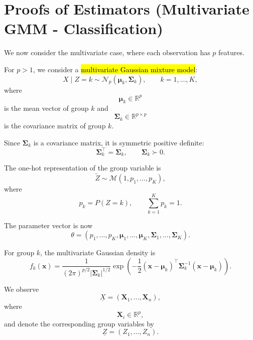 \section{Proofs of Estimators (Multivariate GMM - Classification)}

We now consider the multivariate case, where each observation has
$p$ features.

For $p>1$, we consider a \hl{multivariate Gaussian mixture model}:
\begin{equation*}
X\mid Z=k
\sim
\mathcal{N}_p(\boldsymbol{\mu}_k,\boldsymbol{\Sigma}_k),
\qquad
k=1,\ldots,K,
\end{equation*}
where
\begin{equation*}
\boldsymbol{\mu}_k\in\mathbb{R}^p
\end{equation*}
is the mean vector of group $k$ and
\begin{equation*}
\boldsymbol{\Sigma}_k\in\mathbb{R}^{p\times p}
\end{equation*}
is the covariance matrix of group $k$.

Since $\boldsymbol{\Sigma}_k$ is a covariance matrix, it is symmetric
positive definite:
\begin{equation*}
\boldsymbol{\Sigma}_k^\top
=
\boldsymbol{\Sigma}_k,
\qquad
\boldsymbol{\Sigma}_k\succ0.
\end{equation*}

The one-hot representation of the group variable is
\begin{equation*}
\tilde{Z}\sim\mathcal{M}(1,p_1,\ldots,p_K),
\end{equation*}
where
\begin{equation*}
p_k=P(Z=k),
\qquad
\sum_{k=1}^Kp_k=1.
\end{equation*}

The parameter vector is now
\begin{equation*}
\theta=
\left(
p_1,\ldots,p_K,
\boldsymbol{\mu}_1,\ldots,\boldsymbol{\mu}_K,
\boldsymbol{\Sigma}_1,\ldots,\boldsymbol{\Sigma}_K
\right).
\end{equation*}

For group $k$, the multivariate Gaussian density is
\begin{equation*}
f_k(\boldsymbol{x})
=
\frac{1}
{(2\pi)^{p/2}
|\boldsymbol{\Sigma}_k|^{1/2}}
\exp\left(
-\frac{1}{2}
(\boldsymbol{x}-\boldsymbol{\mu}_k)^\top
\boldsymbol{\Sigma}_k^{-1}
(\boldsymbol{x}-\boldsymbol{\mu}_k)
\right).
\end{equation*}

We observe
\begin{equation*}
\underline{X}
=
(\boldsymbol{X}_1,\ldots,\boldsymbol{X}_n),
\end{equation*}
where
\begin{equation*}
\boldsymbol{X}_i\in\mathbb{R}^p,
\end{equation*}
and denote the corresponding group variables by
\begin{equation*}
\underline{Z}=(Z_1,\ldots,Z_n).
\end{equation*}

